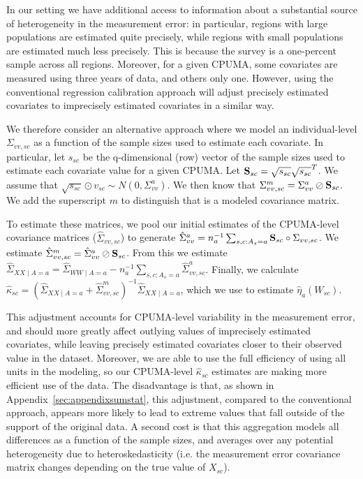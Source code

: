 In our setting we have additional access to information about a substantial source of heterogeneity in the measurement error: in particular, regions with large populations are estimated quite precisely, while regions with small populations are estimated much less precisely. This is because the survey is a one-percent sample across all regions. Moreover, for a given CPUMA, some covariates are measured using three years of data, and others only one. However, using the conventional regression calibration approach will adjust precisely estimated covariates to imprecisely estimated covariates in a similar way. 

We therefore consider an alternative approach where we model an individual-level $\Sigma_{vv, sc}$ as a function of the sample sizes used to estimate each covariate. In particular, let $s_{sc}$ be the q-dimensional (row) vector of the sample sizes used to estimate each covariate value for a given CPUMA. Let $\mathbf{S}_{sc} = \sqrt{s_{sc}}\sqrt{s_{sc}}^T$. We assume that $\sqrt{s_{sc}} \odot v_{sc} \sim N(0, \Sigma_{vv}^a)$. We then know that $\Sigma_{vv, sc}^m = \Sigma_{vv}^a \oslash \mathbf{S}_{sc}$. We add the superscript $m$ to distinguish that is a modeled covariance matrix.

To estimate these matrices, we pool our initial estimates of the CPUMA-level covariance matrices ($\hat{\Sigma}_{vv, sc}$) to generate $\hat{\Sigma}_{vv}^a = n_a^{-1}\sum_{s, c: A_s = a} \mathbf{S}_{sc} \circ \Sigma_{vv, sc}$. We estimate $\hat{\Sigma}_{vv, sc}^m = \hat{\Sigma}_{vv}^a \oslash \mathbf{S}_{sc}$. From this we estimate $\hat{\Sigma}_{XX \mid A = a} = \hat{\Sigma}_{WW \mid A = a} - n_a^{-1}\sum_{s, c: A_s = a}\hat{\Sigma}_{vv, sc}^a$. Finally, we calculate $\hat{\kappa}_{sc} = (\hat{\Sigma}_{XX \mid A = a} + \hat{\Sigma}_{vv, sc}^m)^{-1}\hat{\Sigma}_{XX \mid A = a}$, which we use to estimate $\hat{\eta}_a(W_{sc})$. 

This adjustment accounts for CPUMA-level variability in the measurement error, and should more greatly affect outlying values of imprecisely estimated covariates, while leaving precisely estimated covariates closer to their observed value in the dataset. Moreover, we are able to use the full efficiency of using all units in the modeling, so our CPUMA-level $\hat{\kappa}_{sc}$ estimates are making more efficient use of the data. The disadvantage is that, as shown in Appendix~\ref{sec:appendixsumstat}, this adjustment, compared to the conventional approach, appears more likely to lead to extreme values that fall outside of the support of the original data. A second cost is that this aggregation models all differences as a function of the sample sizes, and averages over any potential heterogeneity due to heteroskedasticity (i.e. the measurement error covariance matrix changes depending on the true value of $X_{sc}$). 